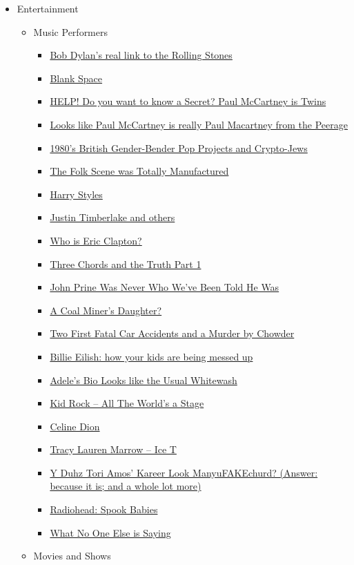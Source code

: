 \documentclass{article}
\newcommand{\insertmydocument}[2]{ %
  \item \href{http://www.mileswmathis.com/#2}{#1}
}
\begin{document}
\begin{itemize}
  \item Entertainment
  \begin{itemize}

    \item Music Performers
    \begin{itemize}

      \insertmydocument{Bob Dylan's real link to the Rolling Stones}{dylan.pdf}
      \insertmydocument{Blank Space}{swift.pdf}
      \insertmydocument{HELP! Do you want to know a Secret? Paul McCartney is Twins}{paul8.pdf}
      \insertmydocument{Looks like Paul McCartney is really Paul Macartney from the Peerage}{macca.pdf}
      \insertmydocument{1980's British Gender-Bender Pop Projects and Crypto-Jews}{twin.pdf}
      \insertmydocument{The Folk Scene was Totally Manufactured}{folk.pdf}
      \insertmydocument{Harry Styles}{styles.pdf}
      \insertmydocument{Justin Timberlake and others}{timber.pdf}
      \insertmydocument{Who is Eric Clapton?}{clap.pdf}
      \insertmydocument{Three Chords and the Truth Part 1}{burns1.pdf}
      \insertmydocument{John Prine Was Never Who We’ve Been Told He Was}{prine.pdf}
      \insertmydocument{A Coal Miner's Daughter?}{coal.pdf}
      \insertmydocument{Two First Fatal Car Accidents and a Murder by Chowder}{twofatals.pdf}
      \insertmydocument{Billie Eilish: how your kids are being messed up}{billie.pdf}
      \insertmydocument{Adele's Bio Looks like the Usual Whitewash}{adele.pdf}
      \insertmydocument{Kid Rock – All The World’s a Stage}{kid.pdf}
      \insertmydocument{Celine Dion}{celine.pdf}
      \insertmydocument{Tracy Lauren Marrow – Ice T}{icet.pdf}
      \insertmydocument{Y Duhz Tori Amos’ Kareer Look ManyuFAKEchurd? (Answer: because it is; and a whole lot more)}{amos.pdf}
      \insertmydocument{Radiohead: Spook Babies}{radiohead.pdf}
      \insertmydocument{What No One Else is Saying}{100.pdf}
    \end{itemize}

    \item Movies and Shows
    \begin{itemize}


\end{itemize}
\end{itemize}
\end{itemize}
\end{document}
